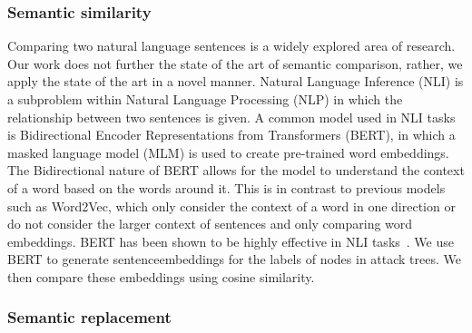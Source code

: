 \subsubsection{Semantic similarity}
\label{ssec:semantic-similarity}


Comparing two natural language sentences is a widely explored area of research. Our work does not further the state of the art of semantic comparison, rather, we apply the state of the art in a novel manner. Natural Language Inference (NLI) is a subproblem within Natural Language Processing (NLP) in which the relationship between two sentences is given. A common model used in NLI tasks is Bidirectional Encoder Representations from Transformers (BERT), in which a masked language model (MLM) is used to create pre-trained word embeddings. The Bidirectional nature of BERT allows for the model to understand the context of a word based on the words around it. This is in contrast to previous models such as Word2Vec, which only consider the context of a word in one direction or do not consider the larger context of sentences and only comparing word embeddings. BERT has been shown to be highly effective in NLI tasks~\cite{devlin_bert_2019}. We use BERT to generate sentenceembeddings for the labels of nodes in attack trees. We then compare these embeddings using cosine similarity.








\subsubsection{Semantic replacement}
\label{ssec:semantic-repalcement}

